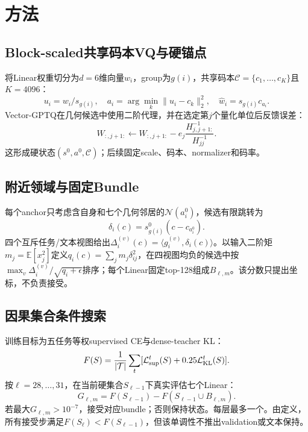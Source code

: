\section{方法}

\subsection{Block-scaled共享码本VQ与硬锚点}

将Linear权重切分为$d=6$维向量$w_i$，group为$g(i)$，共享码本$\mathcal C=\{c_1,\ldots,c_K\}$且$K=4096$：
\begin{equation}
u_i=w_i/s_{g(i)},\quad a_i=\arg\min_k\|u_i-c_k\|_2^2,\quad \hat w_i=s_{g(i)}c_{a_i}.
\end{equation}
Vector-GPTQ在几何候选中使用二阶代理，并在选定第$j$个量化单位后反馈误差：
\begin{equation}
W_{:,j+1:}\leftarrow W_{:,j+1:}-e_j\frac{H^{-1}_{j,j+1:}}{H^{-1}_{jj}}.
\end{equation}
这形成硬状态$(s^0,a^0,\mathcal C)$；后续固定scale、码本、normalizer和码率。

\subsection{附近领域与固定Bundle}

每个anchor只考虑含自身和七个几何邻居的$\mathcal N(a_i^0)$，候选有限跳转为
\begin{equation}
\delta_i(c)=s_{g(i)}^0(c-c_{a_i^0}).
\end{equation}
四个互斥任务/文本视图给出$\Delta_i^{(v)}(c)=\langle g_i^{(v)},\delta_i(c)\rangle$。以输入二阶矩$m_j=\mathbb E[x_j^2]$定义$q_i(c)=\sum_jm_j\delta_{ij}^2$，在四视图均负的候选中按$\max_v\Delta_i^{(v)}/\sqrt{q_i+\epsilon}$排序；每个Linear固定top-128组成$B_{\ell,m}$。该分数只提出坐标，不负责接受。

\subsection{因果集合条件搜索}

训练目标为五任务等权supervised CE与dense-teacher KL：
\begin{equation}
F(S)=\frac1{|\mathcal T|}\sum_t[\mathcal L_{\rm sup}^t(S)+0.25\mathcal L_{\rm KL}^t(S)].
\end{equation}
按$\ell=28,\ldots,31$，在当前硬集合$S_{\ell-1}$下真实评估七个Linear：
\begin{equation}
G_{\ell,m}=F(S_{\ell-1})-F(S_{\ell-1}\cup B_{\ell,m}).
\end{equation}
若最大$G_{\ell,m}>10^{-7}$，接受对应bundle；否则保持状态。每层最多一个。由定义，所有接受步满足$F(S_\ell)<F(S_{\ell-1})$，但该单调性不推出validation或文本保持。

